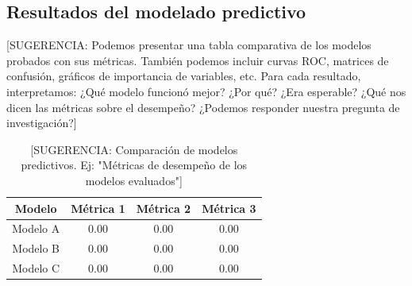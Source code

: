 \subsection{Resultados del modelado predictivo}

[SUGERENCIA: Podemos presentar una tabla comparativa de los modelos probados con sus métricas. También podemos incluir curvas ROC, matrices de confusión, gráficos de importancia de variables, etc. Para cada resultado, interpretamos: ¿Qué modelo funcionó mejor? ¿Por qué? ¿Era esperable? ¿Qué nos dicen las métricas sobre el desempeño? ¿Podemos responder nuestra pregunta de investigación?]

\begin{table}[htbp]
\caption{[SUGERENCIA: Comparación de modelos predictivos. Ej: "Métricas de desempeño de los modelos evaluados"]}
\begin{center}
\begin{tabular}{|c|c|c|c|}
\hline
\textbf{Modelo} & \textbf{Métrica 1} & \textbf{Métrica 2} & \textbf{Métrica 3} \\
\hline
Modelo A & 0.00 & 0.00 & 0.00 \\
\hline
Modelo B & 0.00 & 0.00 & 0.00 \\
\hline
Modelo C & 0.00 & 0.00 & 0.00 \\
\hline
\end{tabular}
\label{tab2}
\end{center}
\end{table}

